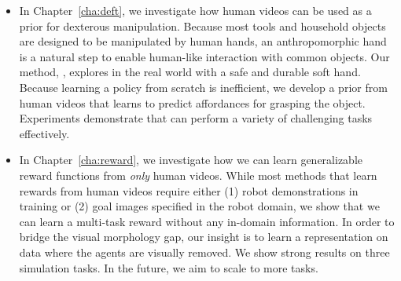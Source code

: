 \vspace{0.1in}
\begin{itemize}
    \item In Chapter~\ref{cha:deft}, we investigate how human videos can be used as a prior for dexterous manipulation. Because most tools and household objects are designed to be manipulated by human hands, an anthropomorphic hand is a natural step to enable human-like interaction with common objects. Our method, \ours, explores in the real world with a safe and durable soft hand. Because learning a policy from scratch is inefficient, we develop a prior from human videos that learns to predict affordances for grasping the object. Experiments demonstrate that \ours can perform a variety of challenging tasks effectively.
    \item In Chapter~\ref{cha:reward}, we investigate how we can learn generalizable reward functions from \textit{only} human videos. While most methods that learn rewards from human videos require either (1) robot demonstrations in training or (2) goal images specified in the robot domain, we show that we can learn a multi-task reward without any in-domain information. In order to bridge the visual morphology gap, our insight is to learn a representation on data where the agents are visually removed. We show strong results on three simulation tasks. In the future, we aim to scale to more tasks.
\end{itemize}
